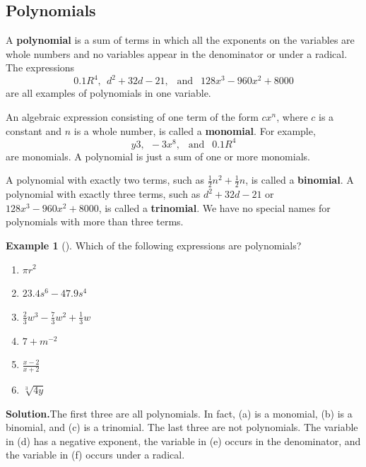 \documentclass[10pt,]{book}
\newcommand{\terminology}[1]{\textbf{#1}}
\theoremstyle{plain}
\theoremstyle{definition}
\theoremstyle{definition}
\newtheorem{example}[theorem]{Example}
\theoremstyle{definition}
\numberwithin{equation}{part}
\begin{document}
\subsection[{Polynomials}]{Polynomials}\label{subsection-26}
A \terminology{polynomial} is a sum of terms in which all the exponents on the variables are whole numbers and no variables appear in the denominator or under a radical. The expressions%
\begin{equation*}
0.1 R^4, ~~d^2 + 32 d − 21, ~~\text{ and }~~128x^3 − 960x^2 + 8000
\end{equation*}
are all examples of polynomials in one variable.%
\par
An algebraic expression consisting of one term of the form \(cx^n\), where \(c\) is a constant and \(n\) is a whole number, is called a \terminology{monomial}. For example,%
\begin{equation*}
y3, ~~−3x^8, ~~\text{ and } ~~0.1R^4
\end{equation*}
are monomials. A polynomial is just a sum of one or more monomials.%
\par
A polynomial with exactly two terms, such as \(\frac{1}{2}n^2 + \frac{1}{2}n\), is called a \terminology{binomial}. A polynomial with exactly three terms, such as \(d^2 + 32 d − 21\) or \(128x^3 − 960x^2 + 8000\), is called a \terminology{trinomial}. We have no special names for polynomials with more than three terms.%
\begin{example}[]\label{example-41}
Which of the following expressions are polynomials? \leavevmode%
\begin{enumerate}[label=*\alph**]
\item\hypertarget{li-206}{}\(\pi r^2\)%
\item\hypertarget{li-207}{}\(23.4s^6 − 47.9s^4\)%
\item\hypertarget{li-208}{}\(\frac{2}{3}w^3 − \frac{7}{3}w^2 + \frac{1}{3}w\)%
\item\hypertarget{li-209}{}\(7 + m^{−2}\)%
\item\hypertarget{li-210}{}\(\frac{x-2}{x+2}\)%
\item\hypertarget{li-211}{}\(\sqrt[3]{4y}\)%
\end{enumerate}
%
\par\medskip\noindent%
\textbf{Solution.}\quad The first three are all polynomials. In fact, (a) is a monomial, (b) is a binomial, and (c) is a trinomial. The last three are not polynomials. The variable in (d) has a negative exponent, the variable in (e) occurs in the denominator, and the variable in (f) occurs under a radical.%
\end{example}
\end{document}
